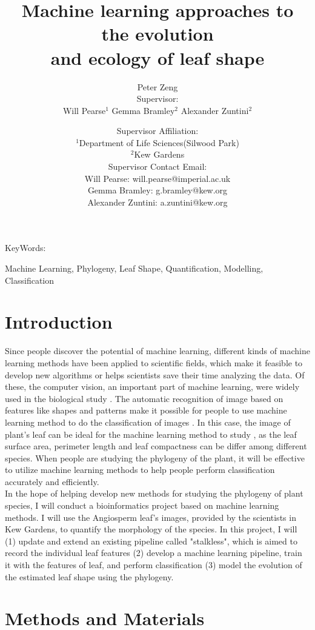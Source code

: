 \documentclass[11pt]{article}
\title{Machine learning approaches to the evolution \\[0.5ex]and ecology of leaf shape\\[6cm]}
\author{Peter Zeng \\[5ex] Supervisor: \\[0.5ex]Will Pearse$^1$ Gemma Bramley$^2$ Alexander Zuntini$^2$\\[2ex]}
\date{%
    Supervisor Affiliation: \\[0.5ex]$^1$Department of Life Sciences(Silwood Park)\\%
    $^2$Kew Gardens\\[2ex] 
    Supervisor Contact Email:\\[0.5ex] Will Pearse: will.pearse@imperial.ac.uk \\[0.5ex] Gemma Bramley: g.bramley@kew.org \\[0.5ex] Alexander Zuntini: a.zuntini@kew.org\\[2ex]%
}
\begin{document}
\onehalfspacing 
\maketitle

\newpage

\begin{center}
\begin{Large} KeyWords: \end{Large} Machine Learning, Phylogeny, Leaf Shape, Quantification, Modelling, Classification
\\[9ex]
\end{center}


\section*{Introduction}
\linenumbers
Since people discover the potential of machine learning, different kinds of machine learning methods have been applied to scientific fields, which make it feasible to develop new algorithms or helps scientists save their time analyzing the data. Of these, the computer vision, an important part of machine learning, were widely used in the biological study \cite{jahne2000computer}. The automatic recognition of image based on features like shapes and patterns make it possible for people to use machine learning method to do the classification of images \cite{nanni2017handcrafted}. In this case, the image of plant's leaf can be ideal for the machine learning method to study \cite{fu2004machine}, as the leaf surface area, perimeter length and leaf compactness can be differ among different species. When people are studying the phylogeny of the plant, it will be effective to utilize machine learning methods to help people perform classification accurately and efficiently.
\\[3ex]
In the hope of helping develop new methods for studying the phylogeny of plant species, I will conduct a bioinformatics project based on machine learning methods. I will use the Angiosperm leaf's images, provided by the scientists in Kew Gardens, to quantify the morphology of the species. In this project, I will (1) update and extend an existing pipeline called "stalkless", which is aimed to record the individual leaf features \cite{pearse2018homogenization} (2) develop a machine learning pipeline, train it with the features of leaf, and perform classification (3) model the evolution of the estimated leaf shape using the phylogeny. 

\nolinenumbers
\section*{Methods and Materials}
\end{document}
